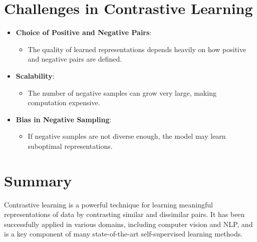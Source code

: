 \begin{notechapter}
\section{Challenges in Contrastive Learning}
\begin{itemize}
    \item \textbf{Choice of Positive and Negative Pairs}:
          \begin{itemize}
              \item The quality of learned representations depends 
                    heavily on how positive and negative pairs are 
                    defined.
          \end{itemize}
    \item \textbf{Scalability}:
          \begin{itemize}
              \item The number of negative samples can grow very large, 
                    making computation expensive.
          \end{itemize}
    \item \textbf{Bias in Negative Sampling}:
          \begin{itemize}
              \item If negative samples are not diverse enough, the 
                    model may learn suboptimal representations.
          \end{itemize}
\end{itemize}

\section{Summary}
Contrastive learning is a powerful technique for learning meaningful 
representations of data by contrasting similar and dissimilar pairs. It 
has been successfully applied in various domains, including computer 
vision and NLP, and is a key component of many state-of-the-art 
self-supervised learning methods.
\end{notechapter}
